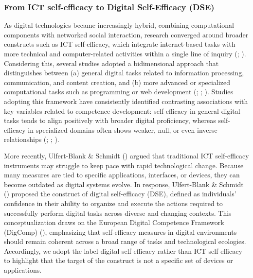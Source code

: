 \documentclass[
  letterpaper,
  DIV=11,
  numbers=noendperiod]{scrartcl}
\begin{document}
\subsubsection{From ICT self-efficacy to Digital Self-Efficacy
(DSE)}\label{from-ict-self-efficacy-to-digital-self-efficacy-dse}

As digital technologies became increasingly hybrid, combining
computational components with networked social interaction, research
converged around broader constructs such as ICT self-efficacy, which
integrate internet-based tasks with more technical and computer-related
activities within a single line of inquiry
(;
).
Considering this, several studies adopted a bidimensional approach that
distinguishes between (a) general digital tasks related to information
processing, communication, and content creation, and (b) more advanced
or specialized computational tasks such as programming or web
development (; ;
). Studies
adopting this framework have consistently identified contrasting
associations with key variables related to competence development:
self-efficacy in general digital tasks tends to align positively with
broader digital proficiency, whereas self-efficacy in specialized
domains often shows weaker, null, or even inverse relationships
(;
;
).

More recently, Ulfert-Blank \& Schmidt
() argued that
traditional ICT self-efficacy instruments may struggle to keep pace with
rapid technological change. Because many measures are tied to specific
applications, interfaces, or devices, they can become outdated as
digital systems evolve. In response, Ulfert-Blank \& Schmidt
() proposed the
construct of digital self-efficacy (DSE), defined as individuals'
confidence in their ability to organize and execute the actions required
to successfully perform digital tasks across diverse and changing
contexts. This conceptualization draws on the European Digital
Competence Framework (DigComp)
(), emphasizing that self-efficacy
measures in digital environments should remain coherent across a broad
range of tasks and technological ecologies. Accordingly, we adopt the
label digital self-efficacy rather than ICT self-efficacy to highlight
that the target of the construct is not a specific set of devices or
applications.
\end{document}
